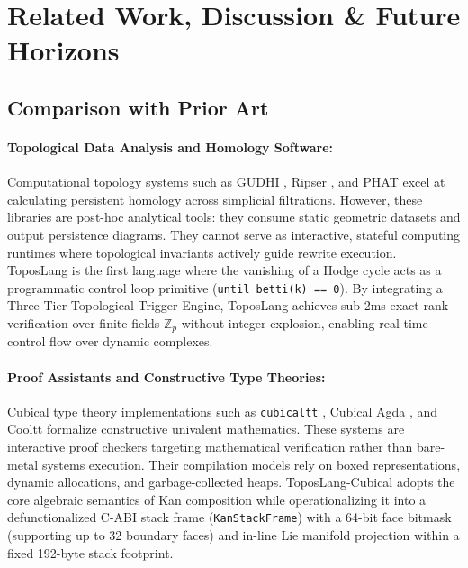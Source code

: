 \documentclass[acmsmall,screen,nonacm]{acmart}
\newcommand{\KSF}{\texttt{KanStackFrame}}
\begin{document}
\section{Related Work, Discussion \& Future Horizons}
\label{sec:related-work}

\subsection{Comparison with Prior Art}
\label{sec:prior-art}

\paragraph{Topological Data Analysis and Homology Software:}
Computational topology systems such as GUDHI \cite{gudhi2015}, Ripser \cite{bauer2021ripser}, and PHAT \cite{bauer2017phat} excel at calculating persistent homology across simplicial filtrations. However, these libraries are post-hoc analytical tools: they consume static geometric datasets and output persistence diagrams. They cannot serve as interactive, stateful computing runtimes where topological invariants actively guide rewrite execution. ToposLang is the first language where the vanishing of a Hodge cycle acts as a programmatic control loop primitive (\lstinline[style=taucode]{until betti(k) == 0}). By integrating a Three-Tier Topological Trigger Engine, ToposLang achieves sub-2ms exact rank verification over finite fields $\mathbb{Z}_p$ without integer explosion, enabling real-time control flow over dynamic complexes.

\paragraph{Proof Assistants and Constructive Type Theories:}
Cubical type theory implementations such as \texttt{cubicaltt} \cite{cohen2016cubical}, Cubical Agda \cite{vezzosi2021cubical}, and Cooltt \cite{sterling2021cooltt} formalize constructive univalent mathematics. These systems are interactive proof checkers targeting mathematical verification rather than bare-metal systems execution. Their compilation models rely on boxed representations, dynamic allocations, and garbage-collected heaps. ToposLang-Cubical adopts the core algebraic semantics of Kan composition while operationalizing it into a defunctionalized C-ABI stack frame (\KSF{}) with a 64-bit face bitmask (supporting up to 32 boundary faces) and in-line Lie manifold projection within a fixed 192-byte stack footprint.
\end{document}
